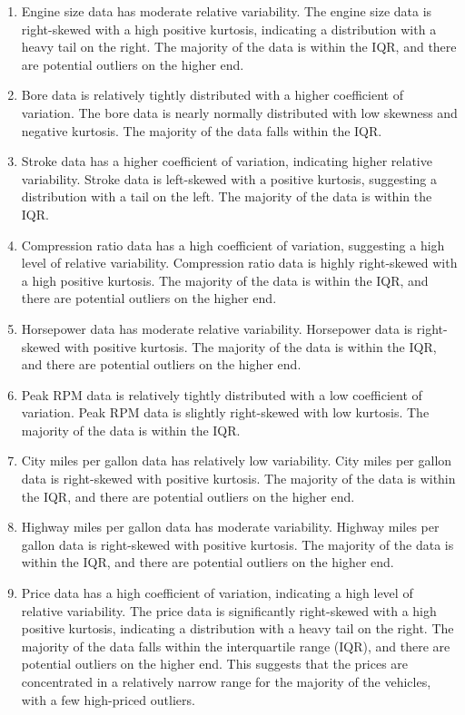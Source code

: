 \documentclass[11pt,a4paper]{article}\usepackage[]{graphicx}\usepackage[]{xcolor}
\begin{document}
\begin{enumerate}
	
	\item Engine size data has moderate relative variability. The engine size data is right-skewed with a high positive kurtosis, indicating a distribution with a heavy tail on the right. The majority of the data is within the IQR, and there are potential outliers on the higher end.
	
	
	\item Bore data is relatively tightly distributed with a higher coefficient of variation. The bore data is nearly normally distributed with low skewness and negative kurtosis. The majority of the data falls within the IQR.
	
	
	\item Stroke data has a higher coefficient of variation, indicating higher relative variability. Stroke data is left-skewed with a positive kurtosis, suggesting a distribution with a tail on the left. The majority of the data is within the IQR.
	
	
	\item Compression ratio data has a high coefficient of variation, suggesting a high level of relative variability. Compression ratio data is highly right-skewed with a high positive kurtosis. The majority of the data is within the IQR, and there are potential outliers on the higher end.
	
	
	\item Horsepower data has moderate relative variability. Horsepower data is right-skewed with positive kurtosis. The majority of the data is within the IQR, and there are potential outliers on the higher end.
	
	
	\item Peak RPM data is relatively tightly distributed with a low coefficient of variation. Peak RPM data is slightly right-skewed with low kurtosis. The majority of the data is within the IQR.
	
	
	\item City miles per gallon data has relatively low variability. City miles per gallon data is right-skewed with positive kurtosis. The majority of the data is within the IQR, and there are potential outliers on the higher end.
	
	
	\item Highway miles per gallon data has moderate variability. Highway miles per gallon data is right-skewed with positive kurtosis. The majority of the data is within the IQR, and there are potential outliers on the higher end.
	
	
	\item Price data has a high coefficient of variation, indicating a high level of relative variability. The price data is significantly right-skewed with a high positive kurtosis, indicating a distribution with a heavy tail on the right. The majority of the data falls within the interquartile range (IQR), and there are potential outliers on the higher end. This suggests that the prices are concentrated in a relatively narrow range for the majority of the vehicles, with a few high-priced outliers.

	\end{enumerate}
\end{document}
